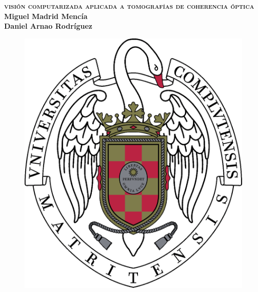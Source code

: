 
\begin{titlepage}
\begin{center}
  \Huge\textbf{\textsc{visión computarizada aplicada a tomografías de
      coherencia óptica}}\\[1cm]
  \normalsize
  \textbf{\Large Miguel Madrid Mencía \\[0.25cm] Daniel Arnao Rodríguez}\\
  \vspace{0.5cm}
  \begin{figure}[H]
    \centering
    \includegraphics[scale=0.17]{imagenes/logos/logo-ucm.pdf}

\end{figure}
\end{center}
\end{titlepage}
